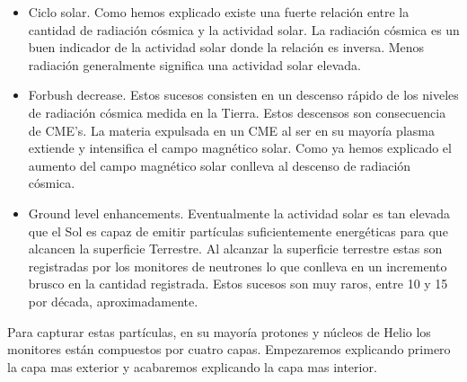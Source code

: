 	\begin{itemize}
	  	\item	Ciclo solar. Como hemos explicado existe una fuerte relación entre la cantidad de radiación cósmica y la actividad solar. 
		  	La radiación cósmica es un buen indicador de la actividad solar donde la relación es inversa. Menos radiación generalmente
			significa una actividad solar elevada.	
		\item	Forbush decrease. Estos sucesos consisten en un descenso rápido de los niveles de radiación cósmica medida en la Tierra. Estos
		  	descensos son consecuencia de CME's. La materia expulsada en un CME al ser en su mayoría plasma extiende y intensifica el 		%
			campo magnético solar. Como ya hemos explicado el aumento del campo magnético solar conlleva al descenso de radiación cósmica. 
		\item	Ground level enhancements. Eventualmente la actividad solar es tan elevada que el Sol es capaz de emitir partículas
		  	suficientemente energéticas para que alcancen la superficie Terrestre. Al alcanzar la superficie terrestre estas son 
			registradas por los monitores de neutrones lo que conlleva en un incremento brusco en la cantidad registrada. Estos sucesos
			son muy raros, entre 10 y 15 por década, aproximadamente.  
	\end{itemize}
	Para capturar estas partículas, en su mayoría protones y núcleos de Helio los monitores están compuestos por cuatro capas. Empezaremos 
	explicando primero la capa mas exterior y acabaremos explicando la capa mas interior.
